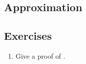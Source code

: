 \documentclass[12pt, leqno, british]{amsart}
\begin{document}
\subsection{Approximation}

\subsection{Exercises}
\begin{enumerate}
\item Give a proof of .
\end{enumerate}
\end{document}
